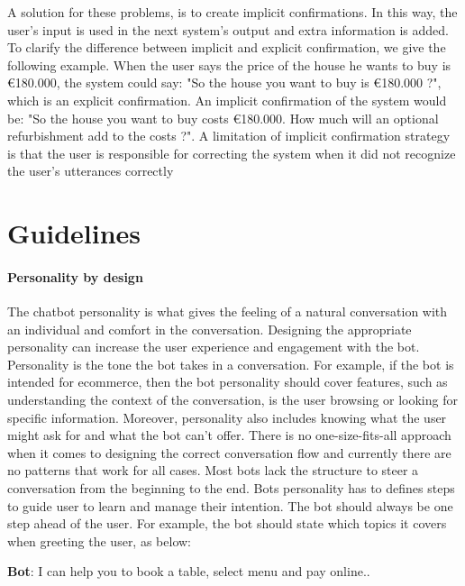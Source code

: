 A solution for these problems, is to create implicit confirmations. In this way, the user’s input is used in the next system’s output and extra information is added. To clarify the difference between implicit and explicit confirmation, we give the following example. When the user says the price of the house he wants to buy is \euro180.000, the system could say: "So the house you want to buy is \euro180.000 ?", which is an explicit confirmation. An implicit confirmation of the system would be: "So the house you want to buy costs \euro180.000. How much will an optional refurbishment add to the costs ?". A limitation of implicit confirmation strategy is that the user is responsible for correcting the system when it did not recognize the user’s utterances correctly \cite{mctear2016}



\section{Guidelines} %

\paragraph{Personality by design}
The chatbot personality is what gives the feeling of a natural conversation with an individual and comfort in the conversation. Designing the appropriate personality can increase the user experience and engagement with the bot. Personality is the tone the bot takes in a conversation. For example, if the bot is intended for ecommerce, then the bot personality should cover features, such as understanding the context of the conversation, is the user browsing or looking for specific information. Moreover, personality also includes knowing what the user might ask for and what the bot can’t offer. There is no one-size-fits-all approach when it comes to designing the correct conversation flow and currently there are no patterns that work for all cases. Most bots lack the structure to steer a conversation from the beginning to the end. Bots personality has to defines steps to guide user to learn and manage their intention. The bot should always be one step ahead of the user. For example, the bot should state which topics it covers when greeting the user, as below:\\

{ \selectfont

  \color{blue}
  \textbf{Bot}: I can help you to book a table, select menu and pay online..\\
 
  \color{black}
}

